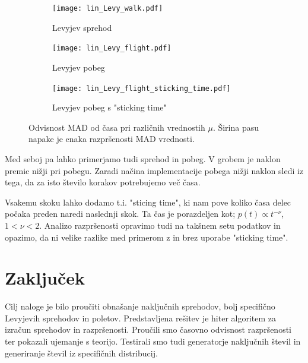 \documentclass[12pt, a4paper]{article}
\begin{document}
\begin{figure}[hbtp]
  \centering
  \begin{subfigure}{.7\textwidth}
    \centering
    \texttt{[image: lin\_Levy\_walk.pdf]}
    \caption{Levyjev sprehod}
    \label{fig:sub1}
  \end{subfigure} 
  
  \begin{subfigure}{.7\textwidth}
    \centering
    \texttt{[image: lin\_Levy\_flight.pdf]}
    \caption{Levyjev pobeg}
    \label{fig:sub2}
  \end{subfigure} 
  
  \begin{subfigure}{.7\textwidth}
    \centering
    \texttt{[image: lin\_Levy\_flight\_sticking\_time.pdf]}
    \caption{Levyjev pobeg s "sticking time"}
    \label{fig:sub3}
  \end{subfigure}
  \caption{Odvisnost MAD od časa pri različnih vrednostih $\mu$. Širina pasu napake je enaka razpršenosti MAD vrednosti.}
  \label{fig:test}
  \end{figure}

  Med seboj pa lahko primerjamo tudi sprehod in pobeg. V grobem je naklon premic nižji pri pobegu. Zaradi načina implementacije pobega nižji naklon sledi iz tega, da za isto število korakov potrebujemo več časa.

  Vsakemu skoku lahko dodamo t.i. "sticing time", ki nam pove koliko časa delec počaka preden naredi naslednji skok. Ta čas je porazdeljen kot; $p(t) \propto t^{-\nu}$, $1 < \nu < 2$. Analizo razpršenosti opravimo tudi na takšnem setu podatkov in opazimo, da ni velike razlike med primerom z in brez uporabe "sticking time".

\section{Zaključek}
Cilj naloge je bilo proučiti obnašanje naključnih sprehodov, bolj specifično Levyjevih sprehodov in poletov. 
Predstavljena rešitev je hiter algoritem za izračun sprehodov in razpršenosti. 
Proučili smo časovno odvisnost razpršenosti ter pokazali ujemanje s teorijo. 
Testirali smo tudi generatorje naključnih števil in generiranje števil iz specifičnih distribucij.
\end{document}
